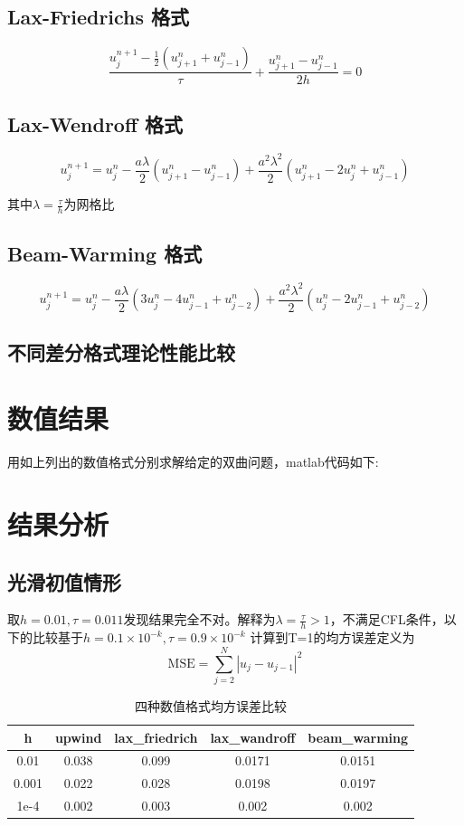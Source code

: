 \documentclass[12pt]{article}
\theoremstyle{remark}
\begin{document}
\subsection{Lax-Friedrichs 格式}
\begin{equation}
\frac{u_j^{n+1}-\frac{1}{2}(u_{j+1}^n+u_{j-1}^n)}{\tau}+\frac{u_{j+1}^n-u_{j-1}^n}{2h}=0
\end{equation}
\subsection{Lax-Wendroff 格式}
\begin{equation}
u_j^{n+1}=u_j^n-\frac{a\lambda}{2}(u^n_{j+1}-u^n_{j-1})+\frac{a^2\lambda^2}{2}(u^n_{j+1}-2u^n_j+u^n_{j-1})
\end{equation}

其中$\lambda=\frac{\tau}{h}$为网格比

\subsection{Beam-Warming 格式}
\begin{equation}
u_j^{n+1}=u_j^n-\frac{a\lambda}{2}(3u^n_{j}-4u^n_{j-1}+u^n_{j-2})+\frac{a^2\lambda^2}{2}(u^n_{j}-2u^n_{j-1}+u^n_{j-2})
\end{equation}
\subsection{不同差分格式理论性能比较}
\section{数值结果}
用如上列出的数值格式分别求解给定的双曲问题，matlab代码如下:

\section{结果分析}
\subsection{光滑初值情形}
取$h=0.01,\tau=0.011$发现结果完全不对。解释为$\lambda=\frac{\tau}{h}>1$，不满足CFL条件，以下的比较基于$h=0.1\times 10^{-k},\tau=0.9\times 10^{-k}$
计算到T=1的均方误差定义为
\begin{equation}
\text{MSE}=\sum_{j=2}^N |u_j-u_{j-1}|^2
\end{equation}
\begin{table}[!ht]
\caption{四种数值格式均方误差比较}
\centering
\begin{tabular}{|c|c|c|c|c|}
\hline
h&upwind&lax\_friedrich&lax\_wandroff&beam\_warming\\
\hline
0.01&0.038&0.099&0.0171&0.0151\\
\hline
0.001&0.022&0.028&0.0198&0.0197\\
\hline
1e-4&0.002&0.003&0.002&0.002\\
\hline
\end{tabular}
\end{table}
\end{document}
